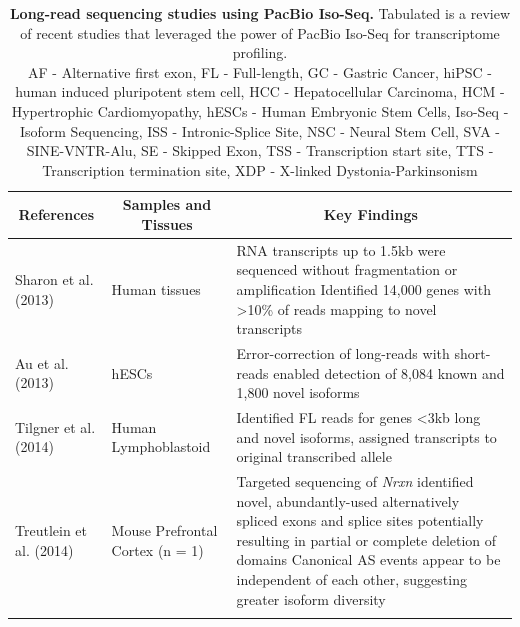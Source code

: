 \begin{landscape}
	\small %
	\setlength\tabcolsep{2pt} %
	\renewcommand{\arraystretch}{1}
	\begin{longtable}[c]{p{4cm}p{4cm}p{18cm}}
		\caption[Long-read sequencing studies using PacBio Iso-Seq]%
		{\textbf{Long-read sequencing studies using PacBio Iso-Seq.} Tabulated is a review of recent studies that leveraged the power of PacBio Iso-Seq for transcriptome profiling. \newline AF - Alternative first exon, FL - Full-length, GC - Gastric Cancer, hiPSC - human induced pluripotent stem cell, HCC - Hepatocellular Carcinoma, HCM - Hypertrophic Cardiomyopathy, hESCs - Human Embryonic Stem Cells, Iso-Seq - Isoform Sequencing, ISS - Intronic-Splice Site, NSC - Neural Stem Cell, SVA - SINE-VNTR-Alu, SE - Skipped Exon, TSS - Transcription start site, TTS - Transcription termination site, XDP - X-linked Dystonia-Parkinsonism}
		\label{tab: longread_isoseqstudies}\\
		
		\toprule
		\multicolumn{1}{c}{References} &
		\multicolumn{1}{c}{Samples and Tissues} &
		\multicolumn{1}{c}{Key Findings} \\* \midrule
		\endfirsthead
		\endhead
		\bottomrule
		\endfoot
		\endlastfoot
		\centering Sharon et al. (2013)\cite{Sharon2013} &
		\centering 20 Human tissues &
		\tabitem RNA transcripts up to 1.5kb were sequenced without fragmentation or amplification \newline
		\tabitem Identified 14,000 genes with >10\% of reads mapping to novel transcripts  \\
		\hdashline[0.5pt/5pt] 
		
		\centering Au et al. (2013)\cite{Au2013} &
		\centering hESCs &
		\tabitem Error-correction of long-reads with short-reads enabled detection of 8,084 known and 1,800 novel isoforms \\
		\hdashline[0.5pt/5pt]
		
		\centering Tilgner et al. (2014) \cite{Tilgner2014} &
		\centering Human Lymphoblastoid  &
		\tabitem Identified FL reads for genes <3kb long and novel isoforms, assigned transcripts to original transcribed allele \\
		\hdashline[0.5pt/5pt]
		
		\centering Treutlein et al. (2014)\cite{Treutlein2014} &
		\centering Mouse Prefrontal Cortex (n = 1) &
		\tabitem Targeted sequencing of \textit{Nrxn} identified novel, abundantly-used alternatively spliced exons and splice sites potentially resulting in partial or complete deletion of domains \newline
		\tabitem Canonical AS events appear to be independent of each other, suggesting greater isoform diversity  \\
		\hdashline[0.5pt/5pt]
		

\end{longtable}
\end{landscape}
